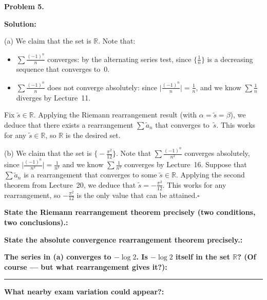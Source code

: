 \documentclass[12pt]{article}
\newcommand{\fillfield}[1]{%
  \par\noindent\textbf{#1:}\enspace\hrulefill\par\vspace{3pt}%
}
\newcommand{\fillfieldlong}[1]{%
  \par\noindent\textbf{#1:}\par\vspace{1.5cm}%
  \noindent\rule{\linewidth}{0.35pt}\par\vspace{4pt}%
}
\begin{document}
\begin{tcolorbox}[
  enhanced, breakable,
  colback  = solgreen,
  colframe = green!45!black,
  fonttitle = \bfseries,
  title = {\textsc{Official Solution}\hfill Homework 7 -- Solutions}
]
\textbf{Problem 5.}

\medskip\textbf{Solution:}

\medskip
(a) We claim that the set is $\mathbb{R}$.
Note that:
\begin{itemize}[nosep, leftmargin=1.5em]
  \item $\sum \frac{(-1)^n}{n}$ converges: by the alternating series test, since
    $\bigl\{\frac{1}{n}\bigr\}$ is a decreasing sequence that converges to~$0$.
  \item $\sum \frac{(-1)^n}{n}$ does not converge absolutely: since
    $\bigl|\frac{(-1)^n}{n}\bigr| = \frac{1}{n}$, and we know $\sum \frac{1}{n}$
    diverges by Lecture~11.
\end{itemize}
Fix $\tilde{s} \in \mathbb{R}$.
Applying the Riemann rearrangement result (with $\alpha = \tilde{s} = \beta$), we deduce
that there exists a rearrangement $\sum \tilde{a}_n$ that converges to~$\tilde{s}$.
This works for any $\tilde{s} \in \mathbb{R}$, so $\mathbb{R}$ is the desired set.

\medskip
(b) We claim that the set is $\bigl\{-\frac{\pi^2}{12}\bigr\}$.
Note that $\sum \frac{(-1)^n}{n^2}$ converges absolutely, since
$\bigl|\frac{(-1)^n}{n^2}\bigr| = \frac{1}{n^2}$ and we know $\sum \frac{1}{n^2}$
converges by Lecture~16.
Suppose that $\sum \tilde{a}_n$ is a rearrangement that converges to some
$\tilde{s} \in \mathbb{R}$.
Applying the second theorem from Lecture~20, we deduce that $\tilde{s} = -\frac{\pi^2}{12}$.
This works for any rearrangement, so $-\frac{\pi^2}{12}$ is the only value that can be
attained.\hfill$\square$
\end{tcolorbox}

\bigskip

\begin{tcolorbox}[
  enhanced, breakable,
  colback  = reflectcyan,
  colframe = cyan!55!black,
  fonttitle = \bfseries,
  title = {\textsc{Reflection \& Variation}}
]
\fillfield{State the Riemann rearrangement theorem precisely (two conditions, two conclusions).}
\fillfield{State the absolute convergence rearrangement theorem precisely.}
\fillfieldlong{The series in (a) converges to $-\log 2$. Is $-\log 2$ itself in the set $\mathbb{R}$? (Of course — but what rearrangement gives it?)}
\fillfield{What nearby exam variation could appear?}
\end{tcolorbox}
\end{document}
